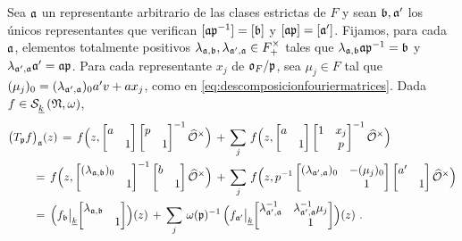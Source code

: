 Sea $\frak{a}$ un representante arbitrario de las clases estrictas de $F$ y
sean $\frak{b},\frak{a}'$ los \'{u}nicos representantes que verifican
$[\frak{a}\frak{p}^{-1}]=[\frak{b}]$ y $[\frak{a}\frak{p}]=[\frak{a}']$.
Fijamos, para cada $\frak{a}$, elementos totalmente positivos
$\lambda_{\frak{a},\frak{b}},\lambda_{\frak{a}',\frak{a}}\in F^{\times}_{+}$
tales que $\lambda_{\frak{a},\frak{b}}\frak{a}\frak{p}^{-1}=\frak{b}$ y
$\lambda_{\frak{a}',\frak{a}}\frak{a}'=\frak{a}\frak{p}$. Para cada
representante $x_{j}$ de $\oka{F}/\frak{p}$, sea $\mu_{j}\in F$ tal que
$(\mu_{j})_{0}=(\lambda_{\frak{a}',\frak{a}})_{0}a'v+ax_{j}$, como en
\eqref{eq:descomposicionfouriermatrices}. Dada
$f\in\spitzH{k}{\frak{N},\omega}$,
\begin{align*}
	& \big(T_{\frak{p}}f\big)_{\frak{a}}(z) \,=\,
		f\Big(z,
		\left[\begin{matrix}
			a & \\ & 1
		\end{matrix}\right]
		\left[\begin{matrix}
			p & \\ & 1
		\end{matrix}\right]^{-1}\Idfin{\cal{O}}\Big)\,+\,
		\sum_{j}\,f\Big(z,
		\left[\begin{matrix}
			a & \\ & 1
		\end{matrix}\right]
		\left[\begin{matrix}
			1 & x_{j} \\ & p
		\end{matrix}\right]^{-1}\Idfin{\cal{O}}\Big) \\
	& \qquad\,=\,f\Big(z,
		\left[\begin{matrix}
			(\lambda_{\frak{a},\frak{b}})_{0} & \\ & 1
		\end{matrix}\right]^{-1}
		\left[\begin{matrix}
			b & \\ & 1
		\end{matrix}\right]\Idfin{\cal{O}}\Big)\,+\,
		\sum_{j}\,f\Big(z,p^{-1}
		\left[\begin{matrix}
			(\lambda_{\frak{a}',\frak{a}})_{0} & -(\mu_{j})_{0} \\
			& 1
		\end{matrix}\right]
		\left[\begin{matrix}
			a' & \\ & 1
		\end{matrix}\right]\Idfin{\cal{O}}\Big) \\
	& \qquad\,=\,\Big(f_{\frak{b}}\operadormatrices{\peso{k}}{%
			\left[\begin{matrix}
				\lambda_{\frak{a},\frak{b}} & \\ & 1
			\end{matrix}\right]}\Big)(z)\,+\,
		\sum_{j}\,\omega(\frak{p})^{-1}\,\Big(
			f_{\frak{a}'}\operadormatrices{\peso{k}}{%
			\left[\begin{matrix}
				\lambda_{\frak{a}',\frak{a}}^{-1} &
				\lambda_{\frak{a}',\frak{a}}^{-1}\mu_{j} \\
				& 1
			\end{matrix}\right]}\Big)(z)
	\text{ .}
\end{align*}
